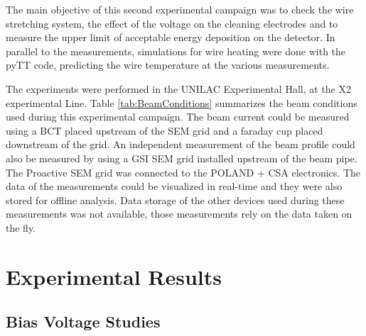The main objective of this second experimental campaign was to check the wire stretching system, the effect of the voltage on the cleaning electrodes and to measure the upper limit of acceptable energy deposition on the detector. In parallel to the measurements, simulations for wire heating were done with the pyTT code, predicting the wire temperature at the various measurements. 

The experiments were performed in the UNILAC Experimental Hall, at the X2 experimental Line. Table \ref{tab:BeamConditions} summarizes the beam conditions used during this experimental campaign. The beam current could be measured using a BCT placed upstream of the SEM grid and a faraday cup placed downstream of the grid. An independent measurement of the beam profile could also be measured by using a GSI SEM grid installed upstream of the beam pipe. The Proactive SEM grid was connected to the POLAND + CSA electronics. The data of the measurements could be visualized in real-time and they were also stored for offline analysis. Data storage of the other devices used during these measurements was not available, those measurements rely on the data taken on the fly. 

\section{Experimental Results}

\subsection{Bias Voltage Studies}


